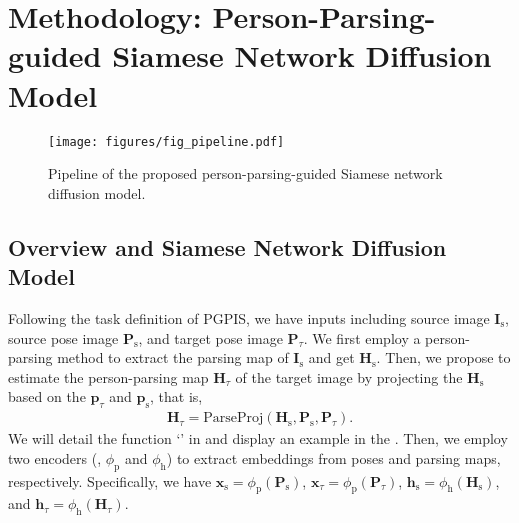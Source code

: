 \section{Methodology: Person-Parsing-guided Siamese Network Diffusion Model}
\label{sec:method}

\begin{figure*}[t]
    \centering
    \texttt{[image: figures/fig\_pipeline.pdf]}
    \caption{Pipeline of the proposed person-parsing-guided Siamese network diffusion model.}
    \label{fig:pipeline}
\end{figure*}


\subsection{Overview and Siamese Network Diffusion Model}
\label{subsec: overview}

%
Following the task definition of PGPIS, we have inputs including source image $\mathbf{I}_\text{s}$, source pose image $\mathbf{P}_\text{s}$, and target pose image $\mathbf{P}_\tau$.
%
We first employ a person-parsing method \cite{li2020self} to extract the parsing map of $\mathbf{I}_\text{s}$ and get $\mathbf{H}_\text{s}$.
%
Then, we propose to estimate the person-parsing map $\mathbf{H}_\tau$ of the target image by projecting the $\mathbf{H}_\text{s}$ based on the $\mathbf{p}_\tau$ and $\mathbf{p}_\text{s}$, that is,
%
\begin{align}\label{eq:parsing-projection}
    \mathbf{H}_\tau =  \text{ParseProj}(\mathbf{H}_\text{s}, \mathbf{P}_\text{s}, \mathbf{P}_\tau).
\end{align}
%
We will detail the function `' in  and display an example in the .
%
Then, we employ two encoders (\ie, $\phi_\text{p}$ and $\phi_\text{h}$) to extract embeddings from poses and parsing maps, respectively.
%
Specifically, we have $\mathbf{x}_\text{s} = \phi_\text{p}(\mathbf{P}_\text{s})$, $\mathbf{x}_\tau =\phi_\text{p}(\mathbf{P}_\tau)$, $\mathbf{h}_\text{s} = \phi_\text{h}(\mathbf{H}_\text{s})$, and $\mathbf{h}_\tau =\phi_\text{h}(\mathbf{H}_\tau)$. 
%

